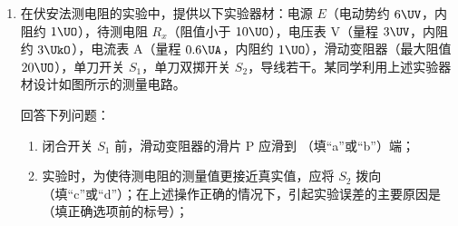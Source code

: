 \documentclass[\gkver]{gaokaozhenti}
\begin{document}
\begin{enumerate}

{当 $\alpha = 45^\circ$ 时，粒子也垂直 $x$ 轴离开磁场}
{粒子入射速率为 $\frac{2\sqrt{3}qBL}{m}$}
{粒子离开磁场的位置到 O 点的最大距离为 $3\sqrt{5}L$}


\item
在伏安法测电阻的实验中，提供以下实验器材：电源 $E$（电动势约 $6\UV$，内阻约 $1\UO$），待测电阻 $R_{x}$（阻值小于 $10\UO$），电压表 V（量程 $3\UV$，内阻约 $3\UkO$），电流表 A（量程 $0.6\UA$，内阻约 $1\UO$），滑动变阻器（最大阻值 $20\UO$），单刀开关 $S_{1}$，单刀双掷开关 $S_{2}$，导线若干。某同学利用上述实验器材设计如图所示的测量电路。

回答下列问题：

\begin{enumerate}
	\item
	闭合开关 $S_{1}$ 前，滑动变阻器的滑片 P 应滑到 （填“a”或“b”）端；
	\item
	实验时，为使待测电阻的测量值更接近真实值，应将 $S_{2}$ 拨向 （填“c”或“d”）；在上述操作正确的情况下，引起实验误差的主要原因是 （填正确选项前的标号）；


\end{enumerate}
\end{enumerate}
\end{document}
